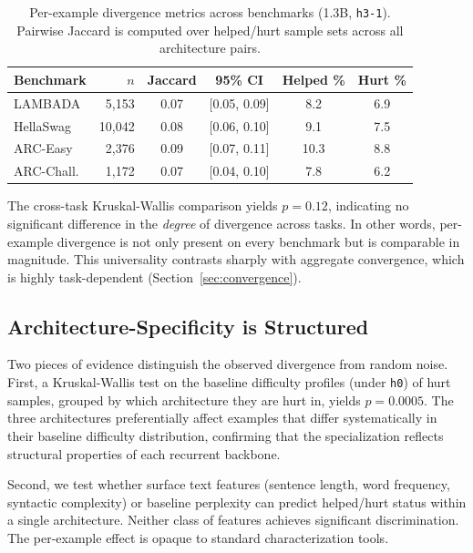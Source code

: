 \documentclass[11pt,a4paper]{article}
\begin{document}
\begin{table}[t]
\centering
\caption{Per-example divergence metrics across benchmarks (1.3B, \texttt{h3-1}). Pairwise Jaccard is computed over helped/hurt sample sets across all architecture pairs.}
\label{tab:divergence}
\small
\begin{tabular}{lrcccc}
\toprule
\textbf{Benchmark} & $n$ & \textbf{Jaccard} & \textbf{95\% CI} & \textbf{Helped \%} & \textbf{Hurt \%} \\
\midrule
LAMBADA & 5,153 & 0.07 & [0.05, 0.09] & 8.2 & 6.9 \\
HellaSwag & 10,042 & 0.08 & [0.06, 0.10] & 9.1 & 7.5 \\
ARC-Easy & 2,376 & 0.09 & [0.07, 0.11] & 10.3 & 8.8 \\
ARC-Chall. & 1,172 & 0.07 & [0.04, 0.10] & 7.8 & 6.2 \\
\bottomrule
\end{tabular}
\end{table}

The cross-task Kruskal-Wallis comparison yields $p = 0.12$, indicating no significant difference in the \emph{degree} of divergence across tasks. In other words, per-example divergence is not only present on every benchmark but is comparable in magnitude. This universality contrasts sharply with aggregate convergence, which is highly task-dependent (Section~\ref{sec:convergence}).

\subsection{Architecture-Specificity is Structured}
\label{sec:structured}

Two pieces of evidence distinguish the observed divergence from random noise. First, a Kruskal-Wallis test on the baseline difficulty profiles (under \texttt{h0}) of hurt samples, grouped by which architecture they are hurt in, yields $p = 0.0005$. The three architectures preferentially affect examples that differ systematically in their baseline difficulty distribution, confirming that the specialization reflects structural properties of each recurrent backbone.

Second, we test whether surface text features (sentence length, word frequency, syntactic complexity) or baseline perplexity can predict helped/hurt status within a single architecture. Neither class of features achieves significant discrimination. The per-example effect is opaque to standard characterization tools.
\end{document}
